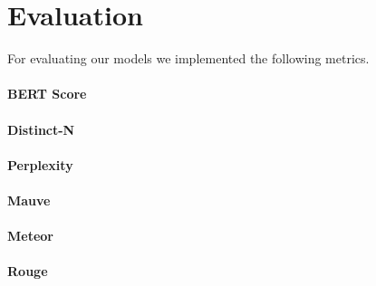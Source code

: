 \section{Evaluation} \label{sec:evaluation}
For evaluating our models we implemented the following metrics.

\paragraph{BERT Score}

\paragraph{Distinct-N}

\paragraph{Perplexity}

\paragraph{Mauve}

\paragraph{Meteor}

\paragraph{Rouge}
